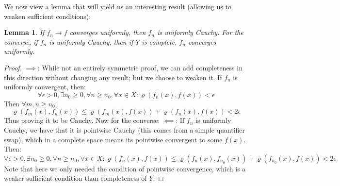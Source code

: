 \documentclass[10pt,letterpaper]{article} %
\newtheorem{lem}{Lemma}[section]
\begin{document}
We now view a lemma that will yield us an interesting result (allowing us to weaken sufficient conditions):
\begin{lem}
If $f_n \xrightarrow{} f$ converges uniformly, then $f_n$ is uniformly Cauchy. For the converse, if $f_n$ is uniformly Cauchy, then if $Y$ is complete, $f_n$ converges uniformly. 
\end{lem}
\begin{proof}
$\implies$: While not an entirely symmetric proof, we can add completeness in this direction without changing any result; but we choose to weaken it. If $f_n$ is uniformly convergent, then:
\begin{equation*}
  \forall \epsilon > 0, \exists n_0 \geqslant 0, \forall n \geqslant n_0, \forall x \in X: \varrho(f_n(x), f(x)) < \epsilon
\end{equation*}
Then $\forall m, n \geqslant n_0$:
\begin{equation*}
  \varrho(f_m(x), f_n(x)) \leqslant \varrho(f_m(x), f(x)) + \varrho(f_n(x), f(x)) < 2\epsilon
\end{equation*}
Thus proving it to be Cauchy. Now for the converse:
$\impliedby$: If $f_n$ is uniformly Cauchy, we have that it is pointwise Cauchy (this comes from a simple quantifier swap), which in a complete space means its pointwise convergent to some $f(x)$. Then:
\begin{equation*}
\forall \epsilon > 0, \exists n_0 \geqslant 0, \forall n \geqslant n_0, \forall x \in X: \varrho(f_n(x), f(x)) \leqslant \varrho(f_n(x), f_{n_0}(x)) + \varrho(f_{n_0}(x), f(x)) < 2\epsilon
\end{equation*}
Note that here we only needed the condition of pointwise convergence, which is a weaker sufficient condition than completeness of $Y$. 
\end{proof}
\end{document}
